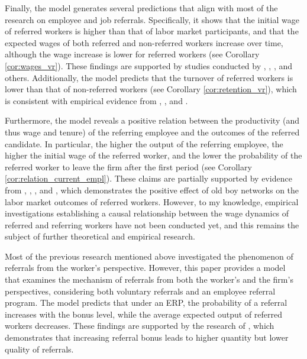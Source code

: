 \documentclass[12pt]{article}
\begin{document}
Finally, the model generates several predictions that align with most of the research on employee and job referrals. Specifically, it shows that the initial wage of referred workers is higher than that of labor market participants, and that the expected wages of both referred and non-referred workers increase over time, although the wage increase is lower for referred workers (see Corollary \ref{cor:wages_vr}). These findings are supported by studies conducted by \cite{corcoran1980most}, \cite{montgomery1991social}, \cite{dustmann2016referral}, and others. Additionally, the model predicts that the turnover of referred workers is lower than that of non-referred workers (see Corollary \ref{cor:retention_vr}), which is consistent with empirical evidence from \cite{pallais2016referential}, \cite{lalanne2016old}, and \cite{lalanne2021social}.

Furthermore, the model reveals a positive relation between the productivity (and thus wage and tenure) of the referring employee and the outcomes of the referred candidate. In particular, the higher the output of the referring employee, the higher the initial wage of the referred worker, and the lower the probability of the referred worker to leave the firm after the first period (see Corollary \ref{cor:relation_current_empl}). These claims are partially supported by evidence from \cite{simon1992matchmaker}, \cite{kugler2003employee}, \cite{pallais2016referential}, and \cite{levati2020impact}, which demonstrates the positive effect of old boy networks on the labor market outcomes of referred workers. However, to my knowledge, empirical investigations establishing a causal relationship between the wage dynamics of referred and referring workers have not been conducted yet, and this remains the subject of further theoretical and empirical research.

Most of the previous research mentioned above investigated the phenomenon of referrals from the worker's perspective. However, this paper provides a model that examines the mechanism of referrals from both the worker's and the firm's perspectives, considering both voluntary referrals and an employee referral program. The model predicts that under an ERP, the probability of a referral increases with the bonus level, while the average expected output of referred workers decreases. These findings are supported by the research of \cite{friebel2023employee}, which demonstrates that increasing referral bonus leads to higher quantity but lower quality of referrals.
\end{document}
